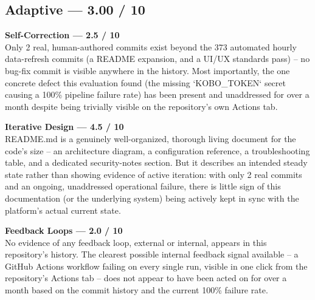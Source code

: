\documentclass[12pt, a4paper]{article}
\begin{document}
\subsection{Adaptive --- 3.00 / 10}
\begin{mdframed}[style=alertbox]\textbf{Self-Correction --- 2.5 / 10}\\
Only 2 real, human-authored commits exist beyond the 373 automated hourly data-refresh commits (a README expansion, and a UI/UX standards pass) -- no bug-fix commit is visible anywhere in the history. Most importantly, the one concrete defect this evaluation found (the missing `KOBO\_TOKEN` secret causing a 100\% pipeline failure rate) has been present and unaddressed for over a month despite being trivially visible on the repository's own Actions tab.\end{mdframed}
\begin{mdframed}[style=alertbox]\textbf{Iterative Design --- 4.5 / 10}\\
README.md is a genuinely well-organized, thorough living document for the code's size -- an architecture diagram, a configuration reference, a troubleshooting table, and a dedicated security-notes section. But it describes an intended steady state rather than showing evidence of active iteration: with only 2 real commits and an ongoing, unaddressed operational failure, there is little sign of this documentation (or the underlying system) being actively kept in sync with the platform's actual current state.\end{mdframed}
\begin{mdframed}[style=alertbox]\textbf{Feedback Loops --- 2.0 / 10}\\
No evidence of any feedback loop, external or internal, appears in this repository's history. The clearest possible internal feedback signal available -- a GitHub Actions workflow failing on every single run, visible in one click from the repository's Actions tab -- does not appear to have been acted on for over a month based on the commit history and the current 100\% failure rate.\end{mdframed}
\end{document}
